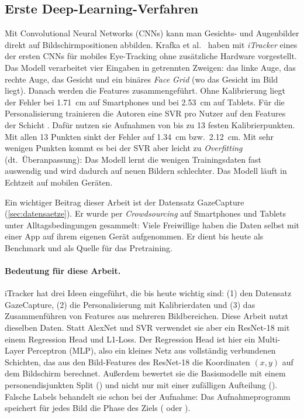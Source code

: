 \subsection{Erste Deep-Learning-Verfahren}
\label{subsec:dl_pioniere}
Mit Convolutional Neural Networks (CNNs) kann man Gesichts- und Augenbilder
direkt auf Bildschirmpositionen abbilden. Krafka et al.~\cite{krafka2016itracker}
haben mit \emph{iTracker} eines der ersten CNNs für mobiles Eye-Tracking ohne
zusätzliche Hardware vorgestellt. Das Modell verarbeitet vier Eingaben in
getrennten Zweigen: das linke Auge, das rechte Auge, das Gesicht und ein
binäres \emph{Face Grid} (wo das Gesicht im Bild liegt). Danach werden die
Features zusammengeführt. Ohne Kalibrierung liegt der Fehler bei
\SI{1,71}{\centi\metre} auf Smartphones und bei \SI{2,53}{\centi\metre} auf
Tablets. Für die Personalisierung trainieren die Autoren eine SVR pro Nutzer
auf den Features der Schicht . Dafür nutzen sie Aufnahmen von bis zu
13 festen Kalibrierpunkten. Mit allen 13 Punkten sinkt der Fehler auf
\SI{1,34}{\centi\metre} bzw.\ \SI{2,12}{\centi\metre}. Mit sehr wenigen Punkten
kommt es bei der SVR aber leicht zu \emph{Overfitting} (dt.\ Überanpassung):
Das Modell lernt die wenigen Trainingsdaten fast auswendig und wird dadurch
auf neuen Bildern schlechter. Das
Modell läuft in Echtzeit auf mobilen Geräten.

Ein wichtiger Beitrag dieser Arbeit ist der Datensatz GazeCapture
(\cref{sec:datensaetze}). Er wurde per \emph{Crowdsourcing} auf Smartphones
und Tablets unter Alltagsbedingungen gesammelt: Viele Freiwillige haben die
Daten selbst mit einer App auf ihrem eigenen Gerät aufgenommen. Er dient
bis heute als Benchmark und als Quelle für das Pretraining.

\paragraph{Bedeutung für diese Arbeit.}
iTracker hat drei Ideen eingeführt, die bis heute wichtig sind: (1) den
Datensatz GazeCapture, (2) die Personalisierung mit Kalibrierdaten und (3) das
Zusammenführen von Features aus mehreren Bildbereichen. Diese Arbeit nutzt
dieselben Daten. Statt AlexNet und SVR verwendet sie aber ein ResNet-18
\cite{he2016resnet} mit einem Regression Head und L1-Loss. Der
Regression Head ist hier ein Multi-Layer Perceptron (MLP), also ein kleines Netz aus
vollständig verbundenen Schichten, das aus den Bild-Features des ResNet-18 die
Koordinaten $(x, y)$ auf dem Bildschirm berechnet. Außerdem
bewertet sie die Basismodelle mit einem personendisjunkten Split
() und nicht nur mit einer zufälligen Aufteilung
(). Falsche Labels behandelt sie schon bei der Aufnahme: Das
Aufnahmeprogramm speichert für jedes Bild die Phase des Ziels
( oder ).

